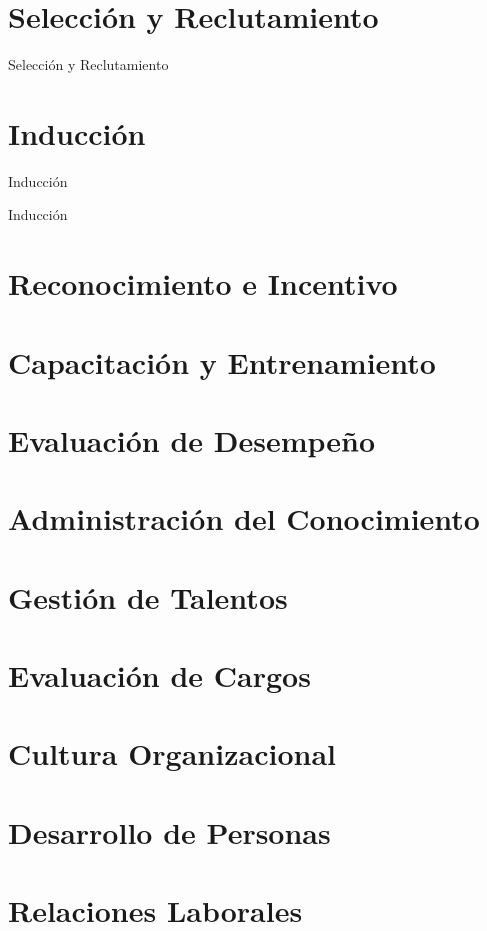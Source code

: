 \documentclass[10pt]{beamer}
\begin{document}
\section{Selección y Reclutamiento}

\begin{frame}{Selección y Reclutamiento}
    
\end{frame}

\section{Inducción}

\begin{frame}{Inducción}
    
\end{frame}

\begin{frame}{Inducción}
    
\end{frame}

\section{Reconocimiento e Incentivo}
\section{Capacitación y Entrenamiento}
\section{Evaluación de Desempeño}
\section{Administración del Conocimiento}
\section{Gestión de Talentos}
\section{Evaluación de Cargos}
\section{Cultura Organizacional}
\section{Desarrollo de Personas}
\section{Relaciones Laborales}
\end{document}
